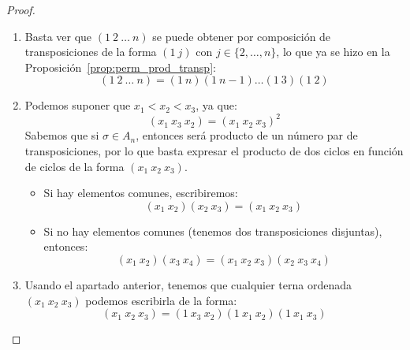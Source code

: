 \begin{prop}
\begin{proof}
\begin{enumerate}[label=(\alph*)]
            \item Basta ver que $(1\ 2\ \ldots\ n)$ se puede obtener por composición de transposiciones de la forma $(1\ j)$ con $j \in \{2,\ldots,n\}$, lo que ya se hizo en la Proposición~\ref{prop:perm_prod_transp}:
                \begin{equation*}
                    (1\ 2\ \ldots\ n) = (1\ n)(1\ n-1)\ldots (1\ 3)(1\ 2)
                \end{equation*}
            \item Podemos suponer que $x_1<x_2<x_3$, ya que:
                \begin{equation*}
                    (x_1\ x_3\ x_2) = {(x_1\ x_2\ x_3)}^{2}
                \end{equation*}
                Sabemos que si $\sigma\in A_n$, entonces será producto de un número par de transposiciones, por lo que basta expresar el producto de dos ciclos en función de ciclos de la forma $(x_1\ x_2\ x_3)$.
                \begin{itemize}
                    \item Si hay elementos comunes, escribiremos:
                        \begin{equation*}
                            (x_1\ x_2)(x_2\ x_3) = (x_1\ x_2\ x_3)
                        \end{equation*}
                    \item Si no hay elementos comunes (tenemos dos transposiciones disjuntas), entonces:
                        \begin{equation*}
                            (x_1\ x_2)(x_3\ x_4) = (x_1\ x_2\ x_3)(x_2\ x_3\ x_4)
                        \end{equation*}
                \end{itemize}
            \item Usando el apartado anterior, tenemos que cualquier terna ordenada $(x_1\ x_2\ x_3)$ podemos escribirla de la forma:
                \begin{equation*}
                    (x_1\ x_2\ x_3) = (1\ x_3\ x_2)(1\ x_1\ x_2)(1\ x_1\ x_3)
                \end{equation*}
        \end{enumerate}
    \end{proof}
\end{prop}

